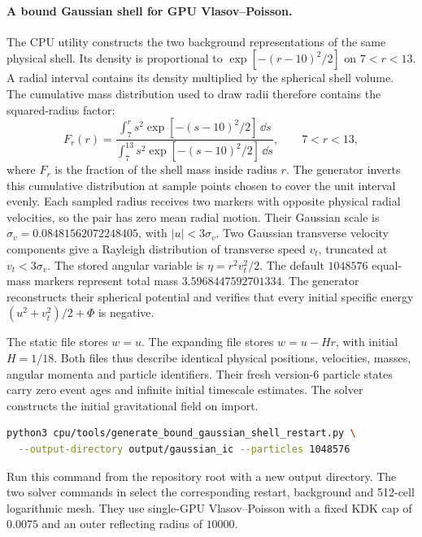 \paragraph{A bound Gaussian shell for GPU Vlasov--Poisson.}
The CPU utility 
constructs the two background representations of the same physical shell.
Its density is proportional to \(\exp[-(r-10)^2/2]\) on \(7<r<13\).
A radial interval contains its density multiplied by the spherical shell
volume. The cumulative mass distribution used to draw radii therefore contains
the squared-radius factor:
\[
 F_r(r)=\frac{\int_7^r s^2\exp[-(s-10)^2/2]\,\dd s}
                  {\int_7^{13} s^2\exp[-(s-10)^2/2]\,\dd s},
 \qquad 7<r<13,
\]
where \(F_r\) is the fraction of the shell mass inside radius \(r\).
The generator inverts this cumulative distribution at sample points chosen
to cover the unit interval evenly. Each sampled radius receives two markers
with opposite physical radial velocities, so the pair has zero mean radial
motion. Their Gaussian scale is \(\sigma_v=0.08481562072248405\),
with \(|u|<3\sigma_v\). Two Gaussian transverse velocity components give a
Rayleigh distribution of transverse speed \(v_t\), truncated at
\(v_t<3\sigma_v\). The stored angular variable is \(\eta=r^2v_t^2/2\).
The default \(1048576\) equal-mass markers represent total mass
\(3.5968447592701334\). The generator reconstructs their spherical potential
and verifies that every initial specific energy
\((u^2+v_t^2)/2+\Phi\) is negative.

The static file stores \(w=u\). The expanding file stores \(w=u-Hr\), with
initial \(H=1/18\). Both files thus describe identical physical positions,
velocities, masses, angular momenta and particle identifiers. Their fresh
version-6 particle states carry zero event ages and infinite initial timescale
estimates. The solver constructs the initial gravitational field on import.
\begin{lstlisting}[language=bash]
python3 cpu/tools/generate_bound_gaussian_shell_restart.py \
  --output-directory output/gaussian_ic --particles 1048576
\end{lstlisting}
Run this command from the repository root with a new output directory.
The two solver commands in
 select the
corresponding restart, background and 512-cell logarithmic mesh.
They use single-GPU Vlasov--Poisson with a fixed KDK cap of \(0.0075\)
and an outer reflecting radius of \(10000\).


